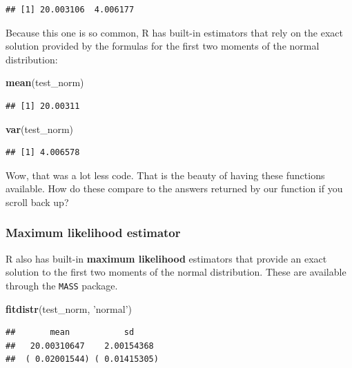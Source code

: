 \documentclass[
]{book}
\newenvironment{Shaded}{\begin{snugshade}}{\end{snugshade}}
\newcommand{\KeywordTok}[1]{\textcolor[rgb]{0.13,0.29,0.53}{\textbf{#1}}}
\newcommand{\NormalTok}[1]{#1}
\newcommand{\StringTok}[1]{\textcolor[rgb]{0.31,0.60,0.02}{#1}}
\begin{document}
\begin{verbatim}
## [1] 20.003106  4.006177
\end{verbatim}

Because this one is so common, R has built-in estimators that rely on
the exact solution provided by the formulas for the first two moments
of the normal distribution:

\begin{Shaded}
\begin{Highlighting}[]
\KeywordTok{mean}\NormalTok{(test_norm)}
\end{Highlighting}
\end{Shaded}

\begin{verbatim}
## [1] 20.00311
\end{verbatim}

\begin{Shaded}
\begin{Highlighting}[]
\KeywordTok{var}\NormalTok{(test_norm)}
\end{Highlighting}
\end{Shaded}

\begin{verbatim}
## [1] 4.006578
\end{verbatim}

Wow, that was a lot less code. That is the beauty of having these functions available. How do these compare to the answers returned by our function if you scroll back up?

\hypertarget{maximum-likelihood-estimator}{%
\subsubsection{Maximum likelihood estimator}\label{maximum-likelihood-estimator}}

R also has built-in \textbf{maximum likelihood} estimators that provide an exact solution to the first two moments of the normal distribution. These are available through the \texttt{MASS} package.

\begin{Shaded}
\begin{Highlighting}[]
\KeywordTok{fitdistr}\NormalTok{(test_norm, }\StringTok{'normal'}\NormalTok{)}
\end{Highlighting}
\end{Shaded}

\begin{verbatim}
##       mean           sd     
##   20.00310647    2.00154368 
##  ( 0.02001544) ( 0.01415305)
\end{verbatim}
\end{document}
